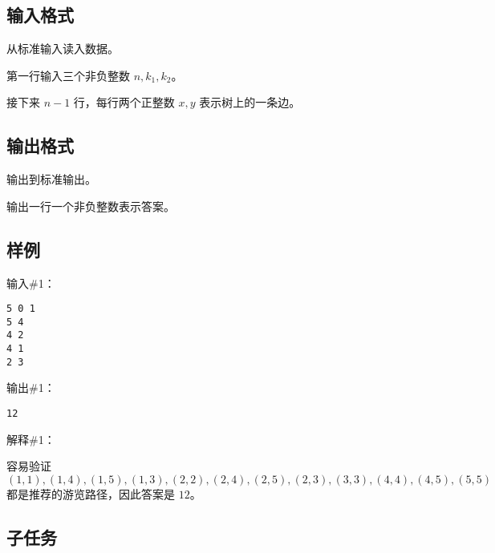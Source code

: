 \subsection*{输入格式}

从标准输入读入数据。

第一行输入三个非负整数 $n,k_1,k_2$。

接下来 $n-1$ 行，每行两个正整数 $x,y$ 表示树上的一条边。

\subsection*{输出格式}

输出到标准输出。

输出一行一个非负整数表示答案。

\subsection*{样例}

输入\#1：

\begin{lstlisting}
5 0 1
5 4
4 2
4 1
2 3
\end{lstlisting}

输出\#1：

\begin{lstlisting}
12
\end{lstlisting}

解释\#1：

容易验证 $(1,1),(1,4),(1,5),(1,3),(2,2),(2,4),(2,5),(2,3),(3,3),(4,4),(4,5),(5,5)$ 都是推荐的游览路径，因此答案是 $12$。

\subsection*{子任务}

